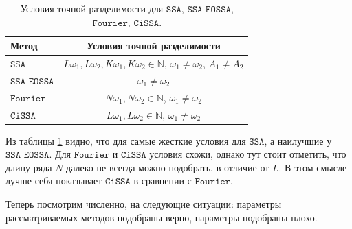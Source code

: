 \documentclass[12pt, specialist, subf
]{disser}
\theoremstyle{definition}
\newcommand{\SSA}{\texttt{SSA}}
\newcommand{\EOSSA}{\texttt{SSA EOSSA}}
\newcommand{\CISSA}{\texttt{CiSSA}}
\newcommand{\FOURIER}{\texttt{Fourier}}
\newcommand{\TS}{\mathsf{X}}
\begin{document}
\begin{table}[H]
    \centering
    \caption{Условия точной разделимости для $\SSA$, $\EOSSA$, $\FOURIER$, $\CISSA$.}
    \label{tab:separability_conditions}
    \begin{tabular}{l|c}
        \hline
        \textbf{Метод}     & \textbf{Условия точной разделимости} \\
        \hline
        $\SSA$     & $L\omega_1, L\omega_2, K\omega_1, K\omega_2 \in \mathbb{N}$, $\omega_1 \ne \omega_2$, $A_1 \ne A_2$ \\
        $\EOSSA$ & $\omega_1 \ne \omega_2$ \\
        $\FOURIER$     & $N\omega_1, N\omega_2 \in \mathbb{N}$, $\omega_1 \ne \omega_2$ \\
        $\CISSA$     & $L\omega_1, L\omega_2 \in \mathbb{N}$, $\omega_1 \ne \omega_2$ \\
        \hline
    \end{tabular}
\end{table}

Из таблицы \ref{tab:separability_conditions} видно, что для самые жесткие условия для $\SSA$, а наилучшие у $\EOSSA$.  Для $\FOURIER$ и $\CISSA$ условия схожи, однако тут стоит отметить, что длину ряда $N$ далеко не всегда можно подобрать, в отличие от $L$. В этом смысле лучше себя показывает $\CISSA$ в сравнении с $\FOURIER$.

Теперь посмотрим численно, на следующие ситуации: параметры рассматриваемых методов подобраны верно, параметры подобраны плохо.




\end{document}
